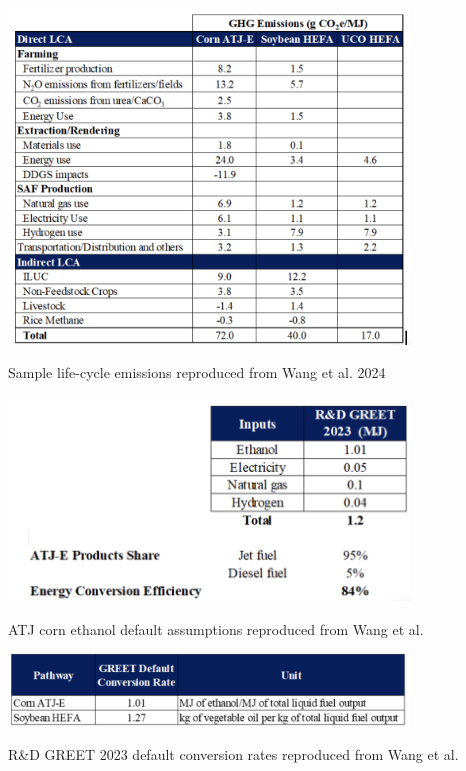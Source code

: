 \documentclass[12pt]{article}
\begin{document}
\begin{table}[H]
\centering
\includegraphics[width=0.8\textwidth]{tb2.png} %
\caption{Sample life-cycle emissions reproduced from Wang et al. 2024}
\label{tab:tb2}
\end{table}


\begin{table}[H]
\centering
\includegraphics[width=0.8\textwidth]{tb3.png} %
\caption{ATJ corn ethanol default assumptions reproduced from Wang et al.}
\label{fig:tb3}
\end{table}

\begin{table}[H]
\centering
\includegraphics[width=0.8\textwidth]{tb4.png} %
\caption{R\&D GREET 2023 default conversion rates  reproduced from Wang et al.}
\label{fig:tb4}
\end{table}
\end{document}
